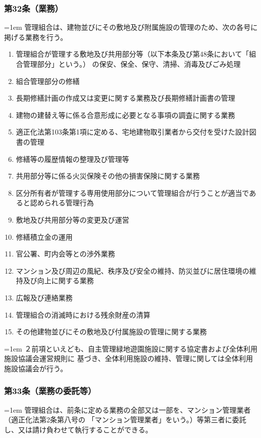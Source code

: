 \documentclass[
  luatex,
  paper=a4paper,
  fontsize=11pt,
  jafontsize=11pt,
  jlreq_notes,
]{jlreq}
\newcommand{\joumain}[1]{%
  \noindent\hangindent=1em\hangafter=1
  \hspace{1em}#1%
}
\newcommand{\kou}[2]{%
  \par\noindent\hangindent=1em\hangafter=1
  #1\hspace{1em}#2%
}
\begin{document}
  \subsubsection*{第32条（業務）}
  \joumain{管理組合は、建物並びにその敷地及び附属施設の管理のため、次の各号に掲げる業務を行う。}
  \begin{enumerate}
    \item 管理組合が管理する敷地及び共用部分等（以下本条及び第48条において「組合管理部分」という。）
          の保安、保全、保守、清掃、消毒及びごみ処理
    \item 組合管理部分の修繕
    \item 長期修繕計画の作成又は変更に関する業務及び長期修繕計画書の管理
    \item 建物の建替え等に係る合意形成に必要となる事項の調査に関する業務
    \item 適正化法第103条第1項に定める、宅地建物取引業者から交付を受けた設計図書の管理
    \item 修繕等の履歴情報の整理及び管理等
    \item 共用部分等に係る火災保険その他の損害保険に関する業務
    \item 区分所有者が管理する専用使用部分について管理組合が行うことが適当であると認められる管理行為
    \item 敷地及び共用部分等の変更及び運営
    \item 修繕積立金の運用
    \item 官公署、町内会等との渉外業務
    \item マンション及び周辺の風紀、秩序及び安全の維持、防災並びに居住環境の維持及び向上に関する業務
    \item 広報及び連絡業務
    \item 管理組合の消滅時における残余財産の清算
    \item その他建物並びにその敷地及び付属施設の管理に関する業務
  \end{enumerate}
  \kou{２}{前項といえども、自主管理緑地遊園施設に関する協定書および全体利用施設協議会運営規則に
  基づき、全体利用施設の維持、管理に関しては全体利用施設協議会が行う。}

  \subsubsection*{第33条（業務の委託等）}
  \joumain{管理組合は、前条に定める業務の全部又は一部を、マンション管理業者（適正化法第2条第八号の
  「マンション管理業者」をいう。）等第三者に委託し、又は請け負わせて執行することができる。}
\end{document}
